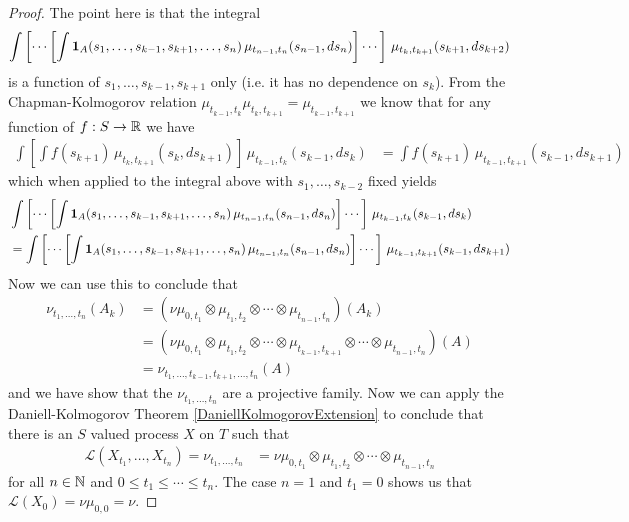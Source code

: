 \begin{proof}
The point here is that the integral
\begin{align*}
\int \left[ \dotsb \left [ \int \textbf{1}_{A}(s_1,
    \dotsc, s_{k-1}, s_{k+1}, \dotsc, s_n) \, \mu_{t_{n-1},t_n}(s_{n-1}, ds_n) \right] \dotsb \right] \, \mu_{t_k, t_{k+1}}(s_{k+1}, ds_{k+2}) 
\end{align*}
is a function of $s_1, \dotsc, s_{k-1}, s_{k+1}$ only (i.e. it has no dependence on $s_k$).  From the Chapman-Kolmogorov relation
$\mu_{t_{k-1}, t_k} \mu_{t_{k}, t_{k+1}}  = \mu_{t_{k-1}, t_{k+1}}$ we
know that for any function of $f : S \to \mathbb{R}$ we have 
\begin{align*}
\int \left [
  \int
f(s_{k+1}) \, \mu_{t_{k}, t_{k+1}} (s_k, ds_{k+1}) \right ] \, \mu_{t_{k-1}, t_k}
(s_{k-1}, ds_{k}) &= \int
f(s_{k+1}) \, \mu_{t_{k-1}, t_{k+1}} (s_{k-1}, ds_{k+1}) 
\end{align*}
which when applied to the integral above with $s_1, \dotsc, s_{k-2}$ fixed yields
\begin{align*}
&\int \left[ \dotsb \left [ \int \textbf{1}_{A}(s_1,
    \dotsc, s_{k-1}, s_{k+1}, \dotsc, s_n) \,
    \mu_{t_{n-1},t_n}(s_{n-1}, ds_n) \right] \dotsb \right] \, \mu_{t_{k-1},
t_{k}}(s_{k-1}, ds_{k}) \\
&=\int \left[ \dotsb \left [ \int \textbf{1}_{A}(s_1,
    \dotsc, s_{k-1}, s_{k+1}, \dotsc, s_n) \,
    \mu_{t_{n-1},t_n}(s_{n-1}, ds_n) \right] \dotsb \right] \,
\mu_{t_{k-1}, t_{k+1}}(s_{k-1}, ds_{k+1})
\end{align*}
Now we can use this to conclude that 
\begin{align*}
\nu_{t_1, \dotsc, t_n}(A_k) &= ( \nu \mu_{0,t_1} \otimes \mu_{t_1, t_2}
\otimes \dotsb \otimes \mu_{t_{n-1}, t_n})(A_k) \\
&= ( \nu \mu_{0,t_1} \otimes \mu_{t_1, t_2} \otimes \dotsb \otimes
\mu_{t_{k-1}, t_{k+1}} \otimes \dotsb \otimes \mu_{t_{n-1}, t_n})(A)
\\
&=\nu_{t_1, \dotsc, t_{k-1}, t_{k+1}, \dotsc, t_n}(A)
 \end{align*}
and we have show that the $\nu_{t_1, \dotsc, t_n}$ are a projective
family.
Now we can apply the Daniell-Kolmogorov Theorem
\ref{DaniellKolmogorovExtension} to conclude that there is an $S$
valued process $X$ on $T$ such that 
\begin{align*}
\mathcal{L}(X_{t_1}, \dotsc, X_{t_n}) = \nu_{t_1, \dotsc, t_n} &= \nu \mu_{0,t_1} \otimes \mu_{t_1, t_2}
\otimes \dotsb \otimes \mu_{t_{n-1}, t_n}
\end{align*}
for all $n \in \mathbb{N}$ and $0 \leq t_1 \leq \dotsb \leq t_n$.  The
case $n=1$ and $t_1 = 0$ shows us that $\mathcal{L}(X_0) = \nu
\mu_{0,0} = \nu$.


\end{proof}
